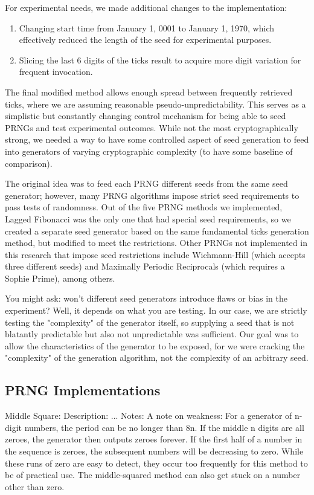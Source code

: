 \documentclass[conference]{IEEEtran}
\begin{document}
For experimental needs, we made additional changes to the implementation:
\begin{enumerate}
    \item Changing start time from January 1, 0001 to January 1, 1970, which effectively reduced the length of the seed for experimental purposes.
    \item Slicing the last 6 digits of the ticks result to acquire more digit variation for frequent invocation.
\end{enumerate}

The final modified method allows enough spread between frequently retrieved ticks, where we are assuming reasonable pseudo-unpredictability. This serves as a simplistic but constantly changing control mechanism for being able to seed PRNGs and test experimental outcomes. While not the most cryptographically strong, we needed a way to have some controlled aspect of seed generation to feed into generators of varying cryptographic complexity (to have some baseline of comparison).

The original idea was to feed each PRNG different seeds from the same seed generator; however, many PRNG algorithms impose strict seed requirements to pass tests of randomness. Out of the five PRNG methods we implemented, Lagged Fibonacci was the only one that had special seed requirements, so we created a separate seed generator based on the same fundamental ticks generation method, but modified to meet the restrictions. Other PRNGs not implemented in this research that impose seed restrictions include Wichmann-Hill (which accepts three different seeds) and Maximally Periodic Reciprocals (which requires a Sophie Prime), among others.

You might ask: won't different seed generators introduce flaws or bias in the experiment? Well, it depends on what you are testing. In our case, we are strictly testing the "complexity" of the generator itself, so supplying a seed that is not blatantly predictable but also not unpredictable was sufficient. Our goal was to allow the characteristics of the generator to be exposed, for we were cracking the "complexity" of the generation algorithm, not the complexity of an arbitrary seed.

\subsection{PRNG Implementations}
Middle Square:
Description:
...
Notes:
A note on weakness: For a generator of n-digit numbers, the period can be no longer than 8n. If the middle n digits are all zeroes, 
the generator then outputs zeroes forever. If the first half of a number in the sequence is zeroes, the subsequent
numbers will be decreasing to zero. While these runs of zero are easy to detect, they occur too frequently for this
method to be of practical use. The middle-squared method can also get stuck on a number other than zero.
\end{document}
